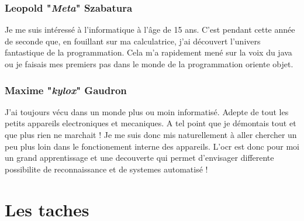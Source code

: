 \documentclass[12pt]{article}
\begin{document}
\subsubsection{Leopold "\textit{Meta}" Szabatura}
Je me suis intéressé à l'informatique à l’âge de 15 ans.
C'est pendant cette année de seconde que, en fouillant sur ma calculatrice, j'ai découvert l'univers fantastique de la programmation.
Cela m'a rapidement mené sur la voix du java ou je faisais mes premiers pas dans le monde de la programmation oriente objet.
\subsubsection{Maxime "\textit{kylox}" Gaudron}
J'ai toujours vécu dans un monde plus ou moin informatisé. Adepte de tout les petits appareils electroniques et mecaniques. A tel point que je démontais tout et que plus rien ne marchait ! Je me suis donc mis naturellement à aller chercher un peu plus loin dans le fonctionement interne des appareils. L'ocr est donc pour moi un grand apprentissage et une decouverte qui permet d'envisager differente possibilite de reconnaissance et de systemes automatisé ! 
\newpage
\section{Les taches}
\end{document}
